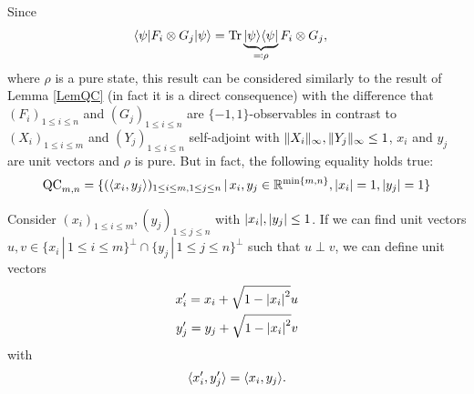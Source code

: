 	Since 
	\begin{align}
		\langle {\psi} \vert F_i\otimes G_j \vert {\psi} \rangle &= \textup{Tr} \, {\underbrace{\vert {\psi} \rangle\langle {\psi} \vert}_{\eqqcolon\rho}F_i\otimes G_j}  ,
	\end{align}
	where $\rho$ is a pure state, this result can be considered similarly to the result of Lemma \ref{LemQC} (in fact it is a direct consequence) with the difference that $(F_i)_{1\leq i \leq n}$ and $(G_j)_{1\leq i \leq n}$ are $\{-1,1\}$-observables in contrast to $(X_i)_{1\leq i \leq m}$ and $(Y_j)_{1\leq i \leq n}$ self-adjoint with $ \Vert {X_i} \Vert_\infty, \Vert {Y_j} \Vert_\infty\leq 1$, $x_i$ and $y_j$ are unit vectors and $\rho$ is pure. But in fact, the following equality holds true:
	\begin{equation}
		\textup{QC}_{m,n} = \{(\langle{x_i},{y_j}\rangle)_{1\leq i\leq m, 1\leq j \leq n} \,| \, x_i,y_j \in \mathbb{R}^{\min\{m,n\}}, {\left|{x_i}\right|}=1, {\left|{y_j}\right|}=1\}
	\end{equation}
	
	Consider $(x_i)_{1\leq i \leq m},(y_j)_{1\leq j \leq n}$ with ${\left|{x_i}\right|},{\left|{y_j}\right|} \leq 1$. If we can find unit vectors $u,v\in\{x_i\,| \, 1\leq i \leq m\}^\perp \cap \{y_j\,| \, 1\leq j \leq n\}^\perp$ such that $u\perp v$, we can define unit vectors
	\begin{align*}
		x_i^\prime = x_i + \sqrt{1-{\left|{x_i}\right|}^2}u\\
		y_j^\prime = y_j + \sqrt{1-{\left|{x_i}\right|}^2}v\\  
	\end{align*}
	with
	\[
		\langle{x_i^\prime},{y_j^\prime}\rangle = \langle{x_i},{y_j}\rangle.
	\] 
	
	
